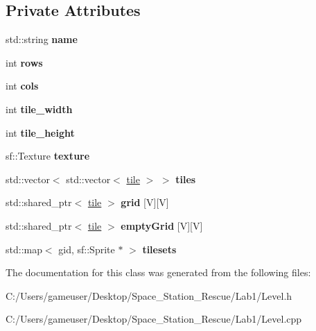 \subsection*{Private Attributes}
\begin{DoxyCompactItemize}
\item 
\mbox{\label{class_level_a7ae61b37551918b3a4ecba7b46135968}} 
std\+::string {\bfseries name}
\item 
\mbox{\label{class_level_a837c1265cab57878edc482c83b24f1f1}} 
int {\bfseries rows}
\item 
\mbox{\label{class_level_ae0123b3a20149c5cf8ea3720764fbe1b}} 
int {\bfseries cols}
\item 
\mbox{\label{class_level_ac846cb2f8b1bd0f92a60a484ce1e50ef}} 
int {\bfseries tile\+\_\+width}
\item 
\mbox{\label{class_level_a75ae0539332f57c52edac380fa0fc0c3}} 
int {\bfseries tile\+\_\+height}
\item 
\mbox{\label{class_level_ad854b95257631dee88a8b8ddc2f895ef}} 
sf\+::\+Texture {\bfseries texture}
\item 
\mbox{\label{class_level_a4312beb9ab25f98b40638caadb542095}} 
std\+::vector$<$ std\+::vector$<$ \mbox{\hyperlink{structtile}{tile}} $>$ $>$ {\bfseries tiles}
\item 
\mbox{\label{class_level_ab97f6164c171d40f8a201e07a4cd3438}} 
std\+::shared\+\_\+ptr$<$ \mbox{\hyperlink{structtile}{tile}} $>$ {\bfseries grid} \mbox{[}V\mbox{]}\mbox{[}V\mbox{]}
\item 
\mbox{\label{class_level_a6eafb2f0e961203fc7d0cdd0dc8da373}} 
std\+::shared\+\_\+ptr$<$ \mbox{\hyperlink{structtile}{tile}} $>$ {\bfseries empty\+Grid} \mbox{[}V\mbox{]}\mbox{[}V\mbox{]}
\item 
\mbox{\label{class_level_a5f6dda7f33634fa6fb2400060a7fa29a}} 
std\+::map$<$ gid, sf\+::\+Sprite $\ast$ $>$ {\bfseries tilesets}
\end{DoxyCompactItemize}


The documentation for this class was generated from the following files\+:\begin{DoxyCompactItemize}
\item 
C\+:/\+Users/gameuser/\+Desktop/\+Space\+\_\+\+Station\+\_\+\+Rescue/\+Lab1/Level.\+h\item 
C\+:/\+Users/gameuser/\+Desktop/\+Space\+\_\+\+Station\+\_\+\+Rescue/\+Lab1/Level.\+cpp\end{DoxyCompactItemize}
